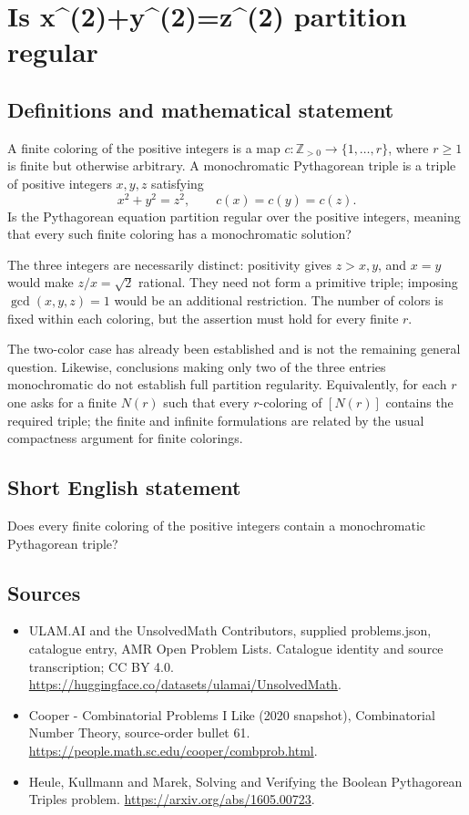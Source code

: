\documentclass[11pt,a4paper]{article}
\begin{document}
\section*{Is x\textasciicircum{}(2)+y\textasciicircum{}(2)=z\textasciicircum{}(2) partition regular}\label{statement}

\subsection{Definitions and mathematical statement}
A finite coloring of the positive integers is a map
$c:\mathbb Z_{>0}\to\{1,\ldots,r\}$, where $r\ge1$ is finite
but otherwise arbitrary. A monochromatic Pythagorean triple is
a triple of positive integers $x,y,z$ satisfying
\[
                  x^2+y^2=z^2,
                    \qquad c(x)=c(y)=c(z).
\]
Is the Pythagorean equation partition regular over the positive
integers, meaning that every such finite coloring has a
monochromatic solution?

The three integers are necessarily distinct: positivity gives
$z>x,y$, and $x=y$ would make $z/x=\sqrt2$ rational. They need
not form a primitive triple; imposing $\gcd(x,y,z)=1$ would be
an additional restriction. The number of colors is fixed within
each coloring, but the assertion must hold for every finite $r$.

The two-color case has already been established and is not the
remaining general question. Likewise, conclusions making only
two of the three entries monochromatic do not establish full
partition regularity. Equivalently, for each $r$ one asks for a
finite $N(r)$ such that every $r$-coloring of $[N(r)]$ contains
the required triple; the finite and infinite formulations are
related by the usual compactness argument for finite colorings.
\subsection{Short English statement}
Does every finite coloring of the positive integers contain a monochromatic Pythagorean triple?
\subsection{Sources}
\begin{itemize}
\item[S1] ULAM.AI and the UnsolvedMath Contributors, supplied problems.json, catalogue entry, AMR Open Problem Lists. Catalogue identity and source transcription; CC BY 4.0.
\url{https://huggingface.co/datasets/ulamai/UnsolvedMath}.
\item[S2] Cooper - Combinatorial Problems I Like (2020 snapshot), Combinatorial Number Theory, source-order bullet 61. 
\url{https://people.math.sc.edu/cooper/combprob.html}.
\item[S3] Heule, Kullmann and Marek, Solving and Verifying the Boolean Pythagorean Triples problem.
\url{https://arxiv.org/abs/1605.00723}.
\end{itemize}
\end{document}
